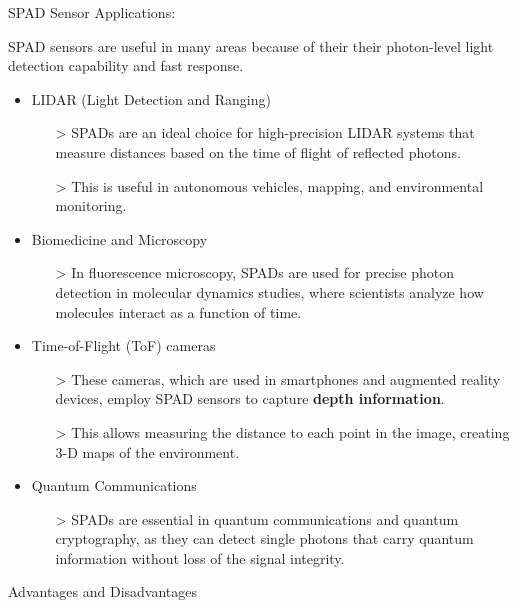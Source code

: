 \vspace{5 mm}

\noindent SPAD Sensor Applications:

\vspace{5 mm}

\noindent SPAD sensors are useful in many areas because of their their photon-level light detection capability and fast response.

\begin{itemize}
\item LIDAR (Light Detection and Ranging)
    \begin{itemize}
    \item[>] SPADs are an ideal choice for high-precision LIDAR systems that measure distances based on the time of flight of reflected photons. 
    \item[>] This is useful in autonomous vehicles, mapping, and environmental monitoring.
    \end{itemize}
\item Biomedicine and Microscopy
    \begin{itemize}
    \item[>] In fluorescence microscopy, SPADs are used for precise photon detection in molecular dynamics studies, where scientists analyze how molecules interact as a function of time.
    \end{itemize}
\item Time-of-Flight (ToF) cameras
    \begin{itemize}
    \item[>] These cameras, which are used in smartphones and augmented reality devices, employ SPAD sensors to capture \textbf{depth information}.
    \item[>] This allows measuring the distance to each point in the image, creating 3-D maps of the environment.
    \end{itemize}
\item Quantum Communications
    \begin{itemize}
    \item[>] SPADs are essential in quantum communications and quantum cryptography, as they can detect single photons that carry quantum information without loss of the signal integrity.
    \end{itemize}
\end{itemize}

\vspace{5 mm}

\noindent Advantages and Disadvantages

